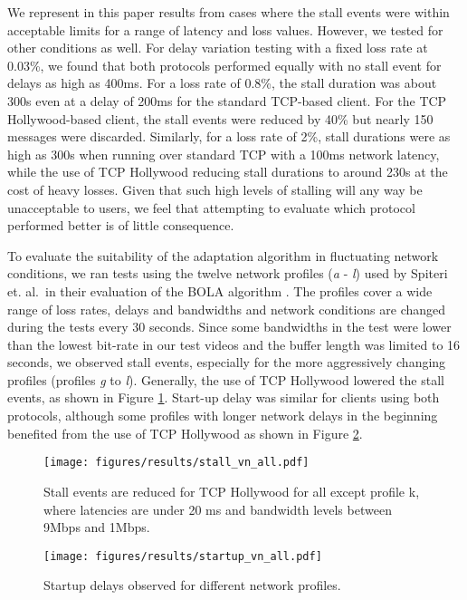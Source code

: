 We represent in this paper results from cases where the stall events were within
acceptable limits for a range of latency and loss values. However, we tested for other
conditions as well. For delay variation testing with a fixed loss rate at 0.03\%, we found
that both protocols performed equally with no stall event for delays as high as 400ms. For
a loss rate of 0.8\%, the stall duration was about 300s even at a delay of 200ms for the
standard TCP-based client. For the TCP Hollywood-based client, the stall events were reduced 
by 40\% but nearly 150
messages were discarded. Similarly, for a loss rate of 2\%, stall durations were as high as
300s when running over standard TCP with a 100ms network latency, while the use of 
TCP Hollywood reducing stall durations 
to around 230s at the cost of heavy losses. Given that such high levels of stalling will
any way be unacceptable to users, we feel that attempting to evaluate which protocol
performed better is of little consequence.

To evaluate the suitability of the adaptation algorithm in fluctuating network conditions,
we ran tests using the twelve network profiles (\emph{a} - \emph{l}) used by Spiteri et.
al.\ in their evaluation of the BOLA algorithm \cite{spiteri2016bola}. The profiles cover a
wide range of loss rates, delays and bandwidths and network conditions are changed during
the tests every 30 seconds. Since some bandwidths in the test were lower than the lowest
bit-rate in our test videos and the buffer length was limited to 16 seconds, we observed
stall events, especially for the more aggressively changing profiles (profiles \emph{g} to
\emph{l}). Generally, the use of TCP Hollywood lowered the stall events, as shown in Figure
\ref{fig:stall_profiles}. Start-up delay was similar for clients using both protocols,
although some profiles with longer network delays in the beginning benefited from the use of TCP Hollywood as shown in Figure \ref{fig:startup_profiles}.

\begin{figure}
  \centering
  \texttt{[image: figures/results/stall\_vn\_all.pdf]}
  \caption{Stall events are reduced for TCP Hollywood for all except profile k, where 
           latencies are under 20 ms and bandwidth levels between 9Mbps and 1Mbps. }
  \label{fig:stall_profiles}
\end{figure}

\begin{figure}
  \centering
  \texttt{[image: figures/results/startup\_vn\_all.pdf]}
  \caption{Startup delays observed for different network profiles. }
  \label{fig:startup_profiles}
\end{figure}




